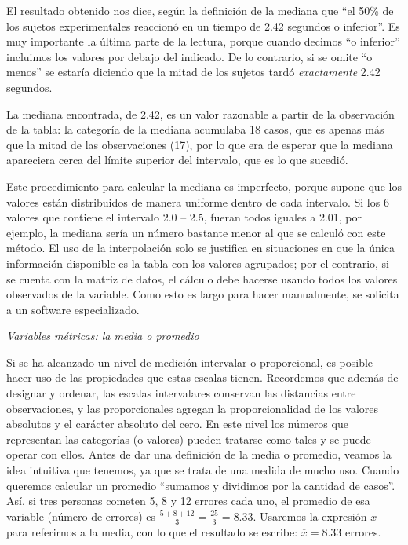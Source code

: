 \documentclass[]{book}
\begin{document}
El resultado obtenido nos dice, según la definición de la mediana que
``el 50\% de los sujetos experimentales reaccionó en un tiempo de 2.42
segundos o inferior''. Es muy importante la última parte de la lectura,
porque cuando decimos ``o inferior'' incluimos los valores por debajo del indicado. De lo contrario, si se omite ``o menos'' se estaría diciendo que la mitad de los sujetos tardó \emph{exactamente} 2.42 segundos.

La mediana encontrada, de 2.42, es un valor razonable a partir de la
observación de la tabla: la categoría de la mediana acumulaba 18 casos,
que es apenas más que la mitad de las observaciones (17), por lo que era
de esperar que la mediana apareciera cerca del límite superior del
intervalo, que es lo que sucedió.

Este procedimiento para calcular la mediana es imperfecto, porque supone que los valores están distribuidos de manera uniforme dentro de cada intervalo. Si los 6 valores que contiene el intervalo 2.0 -- 2.5, fueran
todos iguales a 2.01, por ejemplo, la mediana sería un número bastante
menor al que se calculó con este método. El uso de la interpolación solo
se justifica en situaciones en que la única información disponible es la
tabla con los valores agrupados; por el contrario, si se cuenta con la
matriz de datos, el cálculo debe hacerse usando todos los valores
observados de la variable. Como esto es largo para hacer manualmente, se
solicita a un software especializado.

\emph{Variables métricas: la media o promedio}

Si se ha alcanzado un nivel de medición intervalar o proporcional, es
posible hacer uso de las propiedades que estas escalas tienen.
Recordemos que además de designar y ordenar, las escalas intervalares
conservan las distancias entre observaciones, y las proporcionales
agregan la proporcionalidad de los valores absolutos y el carácter
absoluto del cero. En este nivel los números que representan las
categorías (o valores) pueden tratarse como tales y se puede operar con ellos. Antes de dar una definición de la media o promedio, veamos la idea intuitiva que tenemos, ya que se trata de una medida de mucho uso.
Cuando queremos calcular un promedio ``sumamos y dividimos por la
cantidad de casos''. Así, si tres personas cometen 5, 8 y 12 errores cada uno, el promedio de esa variable (número de errores) es
\(\frac{5 + 8 + 12}{3} = \frac{25}{3} = 8.33\). Usaremos la expresión
\(\overline{x}\) para referirnos a la media, con lo que el resultado se
escribe: \(\overline{x} = 8.33\) errores.
\end{document}
